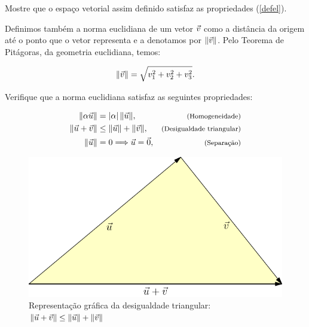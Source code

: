 \begin{exer} Mostre que o espaço vetorial assim definido satisfaz as propriedades (\ref{defel}).
\end{exer}

Definimos também a norma euclidiana de um vetor $\vec{v}$ como a distância da origem até o ponto que o vetor representa e a denotamos por $\|\vec{v}\|$. Pelo Teorema de Pitágoras, da geometria euclidiana, temos:


\begin{equation}\label{defnorma}\|\vec{v}\|=\sqrt{v_1^2+v_2^2+v_3^2}.\end{equation}
\begin{exer}\label{exnorma}Verifique que a norma euclidiana satisfaz as seguintes propriedades:
  
\begin{subequations}\label{propnorma}
\begin{align}
\|\alpha \vec{u}\|&=|\alpha|~\!\|\vec{u}\|,&\hbox{\footnotesize (Homogeneidade)}\label{propnormahom}\\
\|\vec{u}+\vec{v}\|&\leq \|\vec{u}\|+\|\vec{v}\|,&\hbox{\footnotesize (Desigualdade triangular)}\label{propnormatri}\\
\|\vec{u}\|&=0 \Longrightarrow \vec{u}=\vec{0},&\hbox{\footnotesize (Separação)}\label{propnormasep}
\end{align}
\end{subequations}
\end{exer}

\begin{figure}%
\begin{center}
 \includegraphics{./cap_algvet/pics/desigualdade_triangulo}
      \caption{Representação gráfica da desigualdade triangular: $\|\vec{u}+\vec{v}\|\leq \|\vec{u}\|+\|\vec{v}\|$}
      \label{fig:des_triang}
      \end{center}
   \end{figure}

